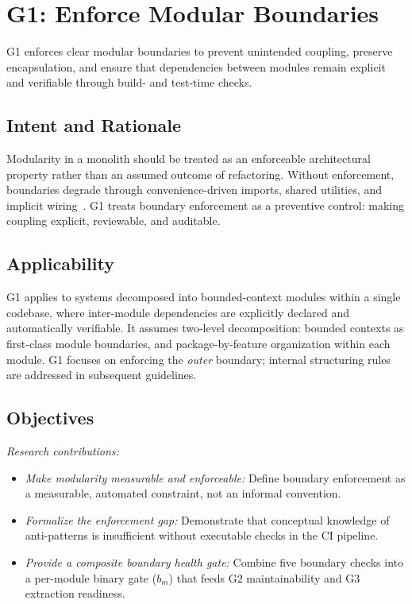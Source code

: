 \section{G1: Enforce Modular Boundaries}
\label{sec:g1-enforce-modular-boundaries}

G1 enforces clear modular boundaries to prevent unintended coupling, preserve encapsulation, and ensure that dependencies between modules remain explicit and verifiable through build- and test-time checks.

\subsection*{Intent and Rationale}
Modularity in a monolith should be treated as an enforceable architectural property rather than an assumed outcome of refactoring. Without enforcement, boundaries degrade through convenience-driven imports, shared utilities, and implicit wiring~\cite{parnas1972informationhiding}. G1 treats boundary enforcement as a preventive control: making coupling explicit, reviewable, and auditable.

\subsection*{Applicability}
G1 applies to systems decomposed into bounded-context modules within a single codebase, where inter-module dependencies are explicitly declared and automatically verifiable. It assumes two-level decomposition: bounded contexts as first-class module boundaries, and package-by-feature organization within each module. G1 focuses on enforcing the \emph{outer} boundary; internal structuring rules are addressed in subsequent guidelines.

\subsection*{Objectives}

\emph{Research contributions:}
\begin{itemize}[itemsep=8pt,topsep=2pt]
  \item \emph{Make modularity measurable and enforceable:} Define boundary enforcement as a measurable, automated constraint, not an informal convention.
  \item \emph{Formalize the enforcement gap:} Demonstrate that conceptual knowledge of anti-patterns is insufficient without executable checks in the CI pipeline.
  \item \emph{Provide a composite boundary health gate:} Combine five boundary checks into a per-module binary gate ($b_m$) that feeds G2 maintainability and G3 extraction readiness.
\end{itemize}

